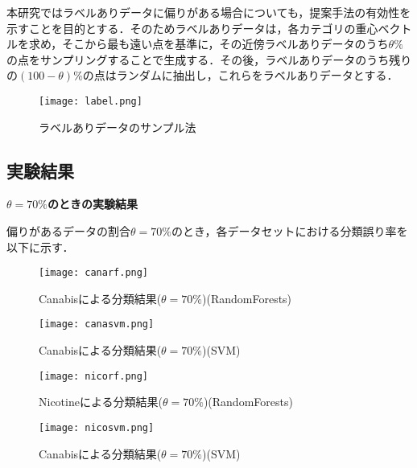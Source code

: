 本研究ではラベルありデータに偏りがある場合についても，提案手法の有効性を示すことを目的とする．そのためラベルありデータは，各カテゴリの重心ベクトルを求め，そこから最も遠い点を基準に，その近傍ラベルありデータのうち$\theta \%$の点をサンプリングすることで生成する．その後，ラベルありデータのうち残りの$(100 - \theta) \%$の点はランダムに抽出し，これらをラベルありデータとする．

\begin{figure}[H]
\centering
\texttt{[image: label.png]}
\caption{ラベルありデータのサンプル法}
\label{label}
\end{figure}\par


\subsection{実験結果}
\label{sec:実験結果}
\begin{flushleft}
\large{\bfseries {$\theta=70\%$のときの実験結果}}
\end{flushleft}

偏りがあるデータの割合$\theta=70\%$のとき，各データセットにおける分類誤り率を以下に示す．


\begin{figure}[H]
\centering
\texttt{[image: canarf.png]}
\caption{Canabisによる分類結果($\theta=70\%$)(RandomForests)}
\label{canarf}
\end{figure}\par
\begin{figure}[H]
\centering
\texttt{[image: canasvm.png]}
\caption{Canabisによる分類結果($\theta=70\%$)(SVM)}
\label{canasvm}
\end{figure}\par
\begin{figure}[H]
\centering
\texttt{[image: nicorf.png]}
\caption{Nicotineによる分類結果($\theta=70\%$)(RandomForests)}
\label{nicorf}
\end{figure}\par
\begin{figure}[H]
\centering
\texttt{[image: nicosvm.png]}
\caption{Canabisによる分類結果($\theta=70\%$)(SVM)}
\label{nicosvm}
\end{figure}\par


